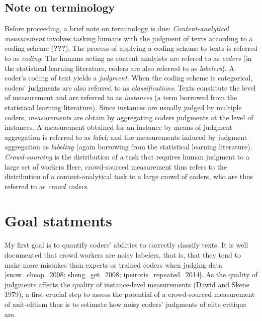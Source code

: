 \documentclass[12pt,]{article}
\begin{document}
\hypertarget{note-on-terminology}{%
\subsection{Note on terminology}\label{note-on-terminology}}

Before proceeding, a brief note on terminology is due:
\emph{Content-analytical measurement} involves tasking humans with the
judgment of texts according to a coding scheme ({\textbf{???}}). The
process of applying a coding scheme to texts is referred to as
\emph{coding}. The humans acting as content analyists are refered to as
\emph{coders} (in the statistical learning literature, coders are also
referred to as \emph{labelers}). A coder's coding of text yields a
\emph{judgment}. When the coding scheme is categorical, coders'
judgments are also referred to as \emph{classifications}. Texts
constitute the level of measurement and are referred to as
\emph{instances} (a term borrowed from the statistical learning
literature). Since instances are usually judged by multiple coders,
\emph{measurements} are obtain by aggregating coders judgments at the
level of instances. A measurement obtained for an instance by means of
judgment aggregation is referred to as \emph{label}; and the
measurements induced by judgment aggregation as \emph{labeling} (again
borrowing from the statistical learning literature).
\emph{Crowd-sourcing} is the distribution of a task that requires human
judgment to a large set of workers Here, crowd-sourced measurement thus
refers to the distribution of a content-analytical task to a large crowd
of coders, who are thus referred to as \emph{crowd coders}.

\hypertarget{goal-statments}{%
\section{Goal statments}\label{goal-statments}}

My first goal is to quantify coders' abilities to correctly classify
texts. It is well documented that crowd workers are noisy labelers, that
is, that they tend to make more mistakes than experts or trained coders
when judging data {[}snow\_cheap\_2008; sheng\_get\_2008;
ipeirotis\_repeated\_2014{]}. As the quality of judgments affects the
quality of instance-level measurements (Dawid and Skene 1979), a first
crucial step to assess the potential of a crowd-sourced measurement of
anit-elitism thus is to estimate how noisy coders' judgments of elite
critique are.
\end{document}
